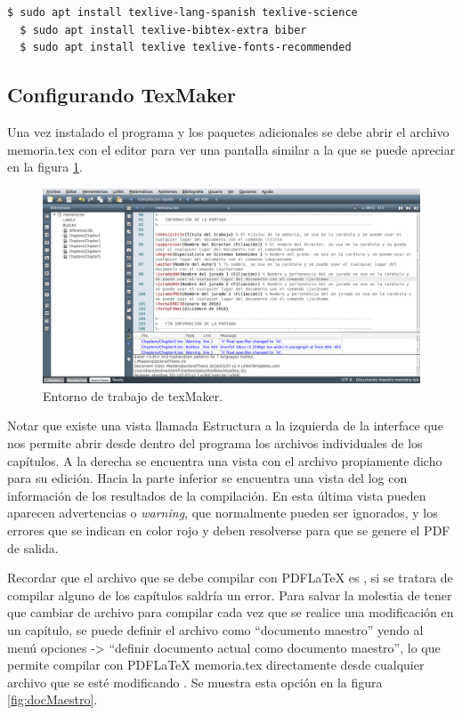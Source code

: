 \begin{lstlisting}[language=bash]
  $ sudo apt install texlive-lang-spanish texlive-science 
  $ sudo apt install texlive-bibtex-extra biber
  $ sudo apt install texlive texlive-fonts-recommended
\end{lstlisting}


\subsection{Configurando TexMaker}


Una vez instalado el programa y los paquetes adicionales se debe abrir el archivo memoria.tex con el editor para ver una pantalla similar a la que se puede apreciar en la figura \ref{fig:texmaker}. 

\begin{figure}[h]
	\centering
	\includegraphics[width=\textwidth]{./Figures/texmaker.png}
	\caption{Entorno de trabajo de texMaker.}
	\label{fig:texmaker}
\end{figure}

Notar que existe una vista llamada Estructura a la izquierda de la interface que nos permite abrir desde dentro del programa los archivos individuales de los capítulos.  A la derecha se encuentra una vista con el archivo propiamente dicho para su edición. Hacia la parte inferior se encuentra una vista del log con información de los resultados de la compilación.  En esta última vista pueden aparecen advertencias o \textit{warning}, que normalmente pueden ser ignorados, y los errores que se indican en color rojo y deben resolverse para que se genere el PDF de salida.

Recordar que el archivo que se debe compilar con PDFLaTeX es , si se tratara de compilar alguno de los capítulos saldría un error.  Para salvar la molestia de tener que cambiar de archivo para compilar cada vez que se realice una modificación en un capítulo, se puede definir el archivo  como ``documento maestro'' yendo al menú opciones -> ``definir documento actual como documento maestro'', lo que permite compilar con PDFLaTeX memoria.tex directamente desde cualquier archivo que se esté modificando . Se muestra esta opción en la figura \ref{fig:docMaestro}.

